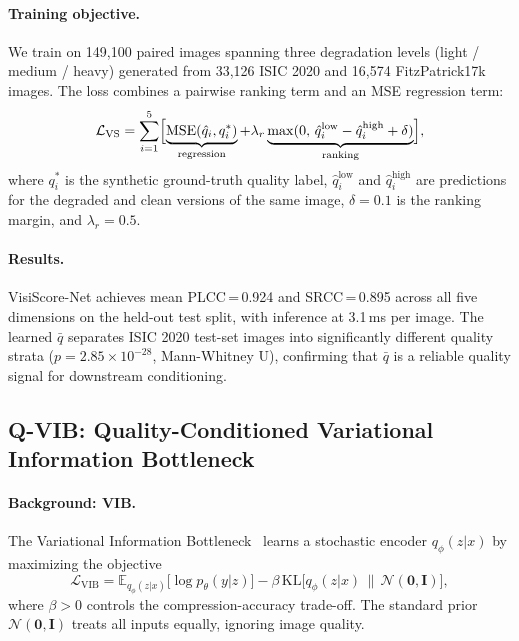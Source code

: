 \paragraph{Training objective.}
We train on 149,100 paired images spanning three degradation levels (light / medium / heavy) generated from 33,126 ISIC 2020 and 16,574 FitzPatrick17k images.
The loss combines a pairwise ranking term and an MSE regression term:
\begin{equation}
  \mathcal{L}_{\text{VS}} = \sum_{i=1}^{5} \Bigl[
    \underbrace{\text{MSE}(\hat{q}_i, q_i^*)}_{\text{regression}}
    + \lambda_r \underbrace{\max(0,\, \hat{q}_i^{\text{low}} - \hat{q}_i^{\text{high}} + \delta)}_{\text{ranking}}
  \Bigr],
  \label{eq:visiscore_loss}
\end{equation}
where $q_i^*$ is the synthetic ground-truth quality label, $\hat{q}_i^{\text{low}}$ and $\hat{q}_i^{\text{high}}$ are predictions for the degraded and clean versions of the same image, $\delta = 0.1$ is the ranking margin, and $\lambda_r = 0.5$.

\paragraph{Results.}
VisiScore-Net achieves mean PLCC\,=\,0.924 and SRCC\,=\,0.895 across all five dimensions on the held-out test split, with inference at 3.1\,ms per image.
The learned $\bar{q}$ separates ISIC 2020 test-set images into significantly different quality strata ($p = 2.85 \times 10^{-28}$, Mann-Whitney U), confirming that $\bar{q}$ is a reliable quality signal for downstream conditioning.

\subsection{Q-VIB: Quality-Conditioned Variational Information Bottleneck}
\label{sec:method:qvib}

\paragraph{Background: VIB.}
The Variational Information Bottleneck~\cite{alemi2017deep} learns a stochastic encoder $q_\phi(z|x)$ by maximizing the objective
\begin{equation}
  \mathcal{L}_{\text{VIB}} = \mathbb{E}_{q_\phi(z|x)}\bigl[\log p_\theta(y|z)\bigr]
    - \beta\, \mathrm{KL}\bigl[q_\phi(z|x) \,\|\, \mathcal{N}(\mathbf{0}, \mathbf{I})\bigr],
  \label{eq:vib}
\end{equation}
where $\beta > 0$ controls the compression-accuracy trade-off.
The standard prior $\mathcal{N}(\mathbf{0}, \mathbf{I})$ treats all inputs equally, ignoring image quality.

